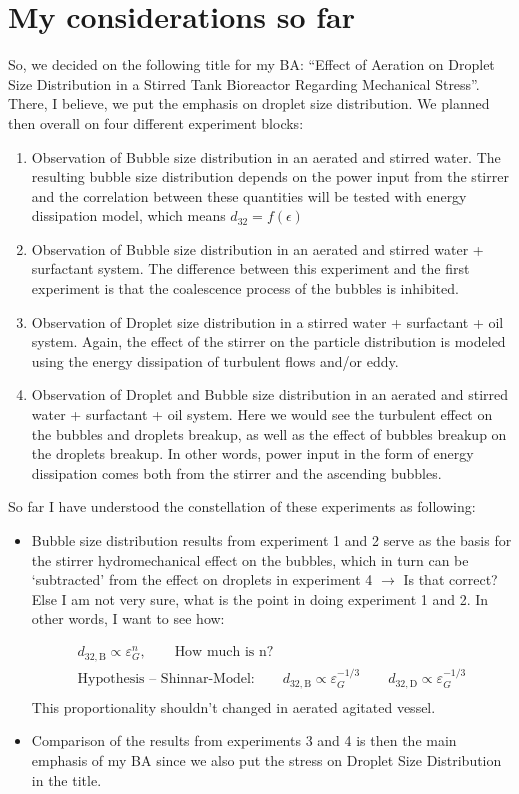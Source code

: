 \section{My considerations so far}
So, we decided on the following title for my BA: “Effect of Aeration on Droplet Size Distribution in a Stirred Tank Bioreactor Regarding Mechanical Stress”. There, I believe, we put the emphasis on droplet size distribution. We planned then overall on four different experiment blocks:

\begin{enumerate}
  \item Observation of Bubble size distribution in an aerated and stirred water. The resulting bubble size distribution depends on the power input from the stirrer and the correlation between these quantities will be tested with energy dissipation model, which means $d_{32} = f \left( \epsilon \right)$
	\item Observation of Bubble size distribution in an aerated and stirred water + surfactant system. The difference between this experiment and the first experiment is that the coalescence process of the bubbles is inhibited.
	\item Observation of Droplet size distribution in a stirred water + surfactant + oil system. Again, the effect of the stirrer on the particle distribution is modeled using the energy dissipation of turbulent flows and/or eddy.
	\item Observation of Droplet and Bubble size distribution in an aerated and stirred water + surfactant + oil system. Here we would see the turbulent effect on the bubbles and droplets breakup, as well as the effect of bubbles breakup on the droplets breakup. In other words, power input in the form of energy dissipation comes both from the stirrer and the ascending bubbles.
\end{enumerate}

So far I have understood the constellation of these experiments as following:
\begin{itemize}
  \item Bubble size distribution results from experiment 1 and 2 serve as the basis for the stirrer hydromechanical effect on the bubbles, which in turn can be ‘subtracted’ from the effect on droplets in experiment 4 $\rightarrow$ Is that correct? Else I am not very sure, what is the point in doing experiment 1 and 2. In other words, I want to see how:

  \begin{align}
    d_{32, \text{B}} \propto \varepsilon_G^n, \qquad \text{How much is n?} \\
    \text{Hypothesis -- Shinnar-Model:} \qquad d_{32, \text{B}} \propto \varepsilon_G^{-1/3} \qquad d_{32, \text{D}} \propto \varepsilon_G^{-1/3} \\
  \end{align}
  This proportionality shouldn't changed in aerated agitated vessel.
	\item Comparison of the results from experiments 3 and 4 is then the main emphasis of my BA since we also put the stress on Droplet Size Distribution in the title.
\end{itemize}

